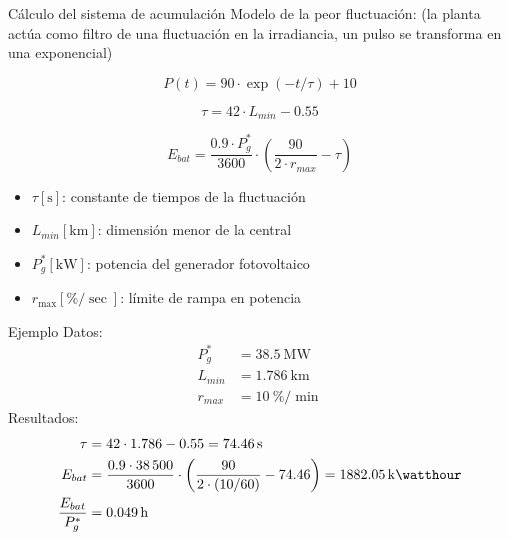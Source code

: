 \documentclass[aspectratio=169, usenames,svgnames,dvipsnames]{beamer}
\begin{document}
\begin{frame}[label={sec:orgffc54f8}]{Cálculo del sistema de acumulación}
Modelo de la peor fluctuación:  (la planta actúa como filtro de una fluctuación en la irradiancia, un pulso se transforma en una exponencial)

\[
  P(t) = 90 \cdot \exp(-t/\tau) + 10
\]

\[
  \tau = 42 \cdot L_{min} - 0.55
\]

\[
  E_{bat} = \frac{0.9 \cdot P_g^*}{3600} \cdot \left( \frac{90}{2 \cdot r_{max}} - \tau \right)
\]

\begin{itemize}
\item \(\tau [\unit{\second}]\): constante de tiempos de la fluctuación
\item \(L_{min} [\unit{\kilo\meter}]\): dimensión menor de la central
\item \(P_g^* [\unit{\kilo\watt}]\): potencia del generador fotovoltaico
\item \(r_{\max} [\unit{\%\per\sec}]\): límite de rampa en potencia
\end{itemize}
\end{frame}

\begin{frame}[label={sec:org86cc3f0}]{Ejemplo}
Datos:
\begin{align*}
  P_g^* &= \qty{38.5}{\mega\watt}\\
  L_{min} &= \qty{1.786}{\kilo\meter}\\
  r_{max} &= \qty{10}{\%\per\min}
\end{align*}
Resultados:
\begin{align*}
  \tau &= 42 \cdot \num{1.786} - \num{0.55} = \qty{74.46}{\second}\\
  E_{bat} &= \frac{\num{0.9} \cdot \num{38500}}{\num{3600}} \cdot \left( \frac{90}{2 \cdot (10/60)} - \num{74.46} \right) = \qty{1882.05}{\kilo\watthour}\\
  \frac{E_{bat}}{P_g^*} &= \qty{0.049}{\hour} 
\end{align*}
\end{frame}
\end{document}
